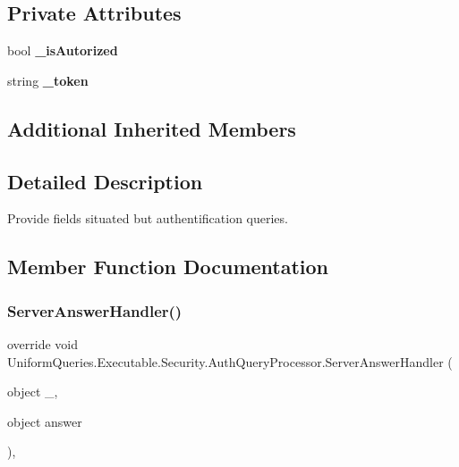 \subsection*{Private Attributes}
\begin{DoxyCompactItemize}
\item 
\mbox{\label{class_uniform_queries_1_1_executable_1_1_security_1_1_auth_query_processor_a23b1d7bffb19465106ccb3d27b3df747}} 
bool {\bfseries \+\_\+is\+Autorized}
\item 
\mbox{\label{class_uniform_queries_1_1_executable_1_1_security_1_1_auth_query_processor_a8e8ef26ec5dbc22e0d5908254a7cf77b}} 
string {\bfseries \+\_\+token}
\end{DoxyCompactItemize}
\subsection*{Additional Inherited Members}


\subsection{Detailed Description}
Provide fields situated but authentification queries. 



\subsection{Member Function Documentation}
\mbox{\label{class_uniform_queries_1_1_executable_1_1_security_1_1_auth_query_processor_a4693289bf81ca5d98fe8f5678a7c4b87}} 
\subsubsection{\texorpdfstring{Server\+Answer\+Handler()}{ServerAnswerHandler()}}
{\footnotesize\ttfamily override void Uniform\+Queries.\+Executable.\+Security.\+Auth\+Query\+Processor.\+Server\+Answer\+Handler (\begin{DoxyParamCaption}\item[{object}]{\+\_\+,  }\item[{object}]{answer }\end{DoxyParamCaption})\hspace{0.3cm}{\ttfamily [protected]}, {\ttfamily [virtual]}}



